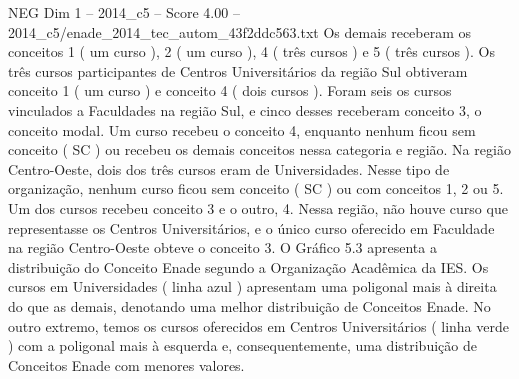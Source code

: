 \begin{textsample}{NEG Dim 1 – 2014\_c5 – Score 4.00 – 2014\_c5/enade\_2014\_tec\_autom\_43f2ddc563.txt}
Os demais receberam os conceitos 1 ( um curso ), 2 ( um curso ), 4 ( três cursos ) e 5 ( três cursos ).
Os três cursos participantes de Centros Universitários da região Sul obtiveram conceito 1 ( um curso ) e conceito 4 ( dois cursos ).
Foram seis os cursos vinculados a Faculdades na região Sul, e cinco desses receberam conceito 3, o conceito modal.
Um curso recebeu o conceito 4, enquanto nenhum ficou sem conceito ( SC ) ou recebeu os demais conceitos nessa categoria e região.
Na região Centro-Oeste, dois dos três cursos eram de Universidades.
Nesse tipo de organização, nenhum curso ficou sem conceito ( SC ) ou com conceitos 1, 2 ou 5.
Um dos cursos recebeu conceito 3 e o outro, 4.
Nessa região, não houve curso que representasse os Centros Universitários, e o único curso oferecido em Faculdade na região Centro-Oeste obteve o conceito 3.
O Gráfico 5.3 apresenta a distribuição do Conceito Enade segundo a Organização Acadêmica da IES.
Os cursos em Universidades ( linha azul ) apresentam uma poligonal mais à direita do que as demais, denotando uma melhor distribuição de Conceitos Enade.
No outro extremo, temos os cursos oferecidos em Centros Universitários ( linha verde ) com a poligonal mais à esquerda e, consequentemente, uma distribuição de Conceitos Enade com menores valores.

\end{textsample}
